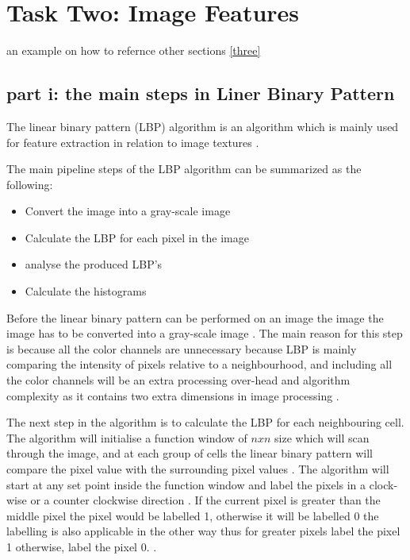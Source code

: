 \documentclass[conference]{IEEEtran}
\begin{document}
\section{Task Two: Image Features} \label{two}
an example on how to refernce other sections \ref{three}
\subsection{part i: the main steps in Liner Binary Pattern}
The linear binary pattern (LBP) algorithm is an algorithm which is mainly used for feature extraction in relation to image textures \cite{b5}. \par

The main pipeline steps of the LBP algorithm can be summarized as the following:
\begin{itemize}
	\item Convert the image into a gray-scale image
	\item Calculate the LBP for each pixel in the image
	\item analyse the produced LBP's
	\item Calculate the histograms
\end{itemize}

Before the linear binary pattern can be performed on an image the image the image has to be converted into a gray-scale image \cite{b5}. The main reason for this step is because all the color channels are unnecessary because LBP is mainly comparing the intensity of pixels relative to a neighbourhood\cite{b5}, and including all the color channels will be an extra processing over-head and algorithm complexity as it contains two extra dimensions in image processing \cite{b7}. \par

The next step in the algorithm is to calculate the LBP for each neighbouring cell. The algorithm will initialise a function window of $nxn$ size which will scan through the image, and at each group of cells the linear binary pattern will compare the pixel value with the surrounding pixel values \cite{b5}. The algorithm will start at any set point inside the function window and label the pixels  in a clock-wise or a counter clockwise direction \cite{b5} \cite{b8}. If the current pixel is greater than the middle pixel the pixel would be labelled 1, otherwise it will be labelled 0 the labelling is also applicable in the other way thus for greater pixels label the pixel 1 otherwise, label the pixel 0. \cite{b8} \cite{b5}. \par
\end{document}
